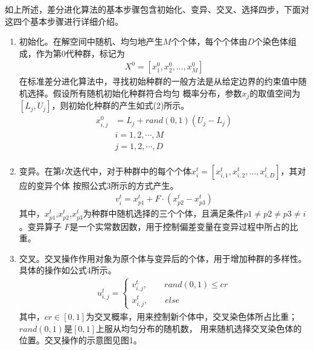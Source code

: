 \documentclass[a4paper,11pt,onecolumn,twoside]{article}
\begin{document}
\begin{CJK*}{GBK}{song}
\begin{multicols}{2}
\indent 如上所述，差分进化算法的基本步骤包含初始化、变异、交叉、选择四步，下面对这四个基本步骤进行详细介绍。
\begin{enumerate}[fullwidth,itemindent=2em,label=(\arabic*)]
\item {初始化}。在解空间中随机、均匀地产生$M$个个体，每个个体由$D$个染色体组成，作为第$0$代种群，标记为
		\begin{equation}
			\begin{split}
				X^0=[x_1^0,x_2^0,...,x_M^0]
			\end{split}
		\end{equation}
在标准差分进化算法中，寻找初始种群的一般方法是从给定边界的约束值中随机选择。假设所有随机初始化种群符合均匀
概率分布，参数$x_j$的取值空间为$[L_j,U_j]$，则初始化种群的产生如式(2)所示。
	\begin{equation}
		\begin{split}
			x_{i,j}^0 &= L_j + rand(0,1)\left(U_j-L_j\right)\\
			& i = 1,2,\cdots,M\\
			& j = 1,2,\cdots,D\\
		\end{split}
	\end{equation}
\item {变异}。在第$t$次迭代中，对于种群中的每个个体$x_i^t=[x_{i,1}^t,x_{i,2}^t,...,x_{i,D}^t]$，其对应的变异个体
按照公式3所示的方式产生。
	\begin{equation}
		\begin{split}
			v_{i}^t = x_{p1}^t+ F\cdot\left(x_{p2}^t-x_{p3}^t\right)
		\end{split}
	\end{equation}
其中，$x_{p1}^t$,$x_{p2}^t$,$x_{p3}^t$为种群中随机选择的三个个体，且满足条件$ p1 \neq p2 \neq p3\neq i$。变异算子
$F$是一个实常数因数，用于控制偏差变量在变异过程中所占的比重。
\item {交叉}。交叉操作作用对象为原个体与变异后的个体，用于增加种群的多样性。具体的操作如公式4所示。
	\begin{equation}
		\begin{split}
			u_{i,j}^t=
			\begin{cases}
				v_{i,j}^t,\qquad rand(0,1)\le cr\\
				x_{i,j}^t,\qquad else
			\end{cases}
		\end{split}
	\end{equation}
其中，$cr\in[0,1]$为交叉概率，用来控制新个体中，交叉染色体所占比重；$rand(0,1)$是$[0,1]$上服从均匀分布的随机数，
用来随机选择交叉染色体的位置。交叉操作的示意图见图1。



\end{enumerate}
\end{multicols}
\end{CJK*}
\end{document}
